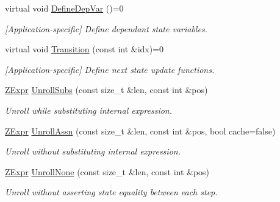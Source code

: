 \begin{DoxyCompactItemize}
\item 
virtual void \mbox{\hyperlink{classilang_1_1_unroller_a97361e0a881ea09d32153166ef41dd82}{Define\+Dep\+Var}} ()=0
\begin{DoxyCompactList}\small\item\em \mbox{[}Application-\/specific\mbox{]} Define dependant state variables. \end{DoxyCompactList}\item 
virtual void \mbox{\hyperlink{classilang_1_1_unroller_a18357c55c9aef2627f0d6340f353cf2b}{Transition}} (const int \&idx)=0
\begin{DoxyCompactList}\small\item\em \mbox{[}Application-\/specific\mbox{]} Define next state update functions. \end{DoxyCompactList}\item 
\mbox{\label{classilang_1_1_unroller_ac3773cd96739964d678d7861defd7c06}} 
\mbox{\hyperlink{classilang_1_1_unroller_a9fd0359e3ffd666f8f92ad3c3ef52673}{Z\+Expr}} \mbox{\hyperlink{classilang_1_1_unroller_ac3773cd96739964d678d7861defd7c06}{Unroll\+Subs}} (const size\+\_\+t \&len, const int \&pos)
\begin{DoxyCompactList}\small\item\em Unroll while substituting internal expression. \end{DoxyCompactList}\item 
\mbox{\label{classilang_1_1_unroller_a85e482449f278419a5c9cd67bf3d9051}} 
\mbox{\hyperlink{classilang_1_1_unroller_a9fd0359e3ffd666f8f92ad3c3ef52673}{Z\+Expr}} \mbox{\hyperlink{classilang_1_1_unroller_a85e482449f278419a5c9cd67bf3d9051}{Unroll\+Assn}} (const size\+\_\+t \&len, const int \&pos, bool cache=false)
\begin{DoxyCompactList}\small\item\em Unroll without substituting internal expression. \end{DoxyCompactList}\item 
\mbox{\label{classilang_1_1_unroller_a305aaab65989bb67b275a2ae69ba2d2b}} 
\mbox{\hyperlink{classilang_1_1_unroller_a9fd0359e3ffd666f8f92ad3c3ef52673}{Z\+Expr}} \mbox{\hyperlink{classilang_1_1_unroller_a305aaab65989bb67b275a2ae69ba2d2b}{Unroll\+None}} (const size\+\_\+t \&len, const int \&pos)
\begin{DoxyCompactList}\small\item\em Unroll without asserting state equality between each step. \end{DoxyCompactList}\end{DoxyCompactItemize}
